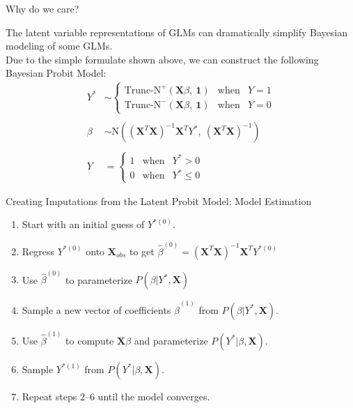 \documentclass{beamer}
\begin{document}
\begin{frame}{Why do we care?}

  The latent variable representations of GLMs can dramatically simplify
  Bayesian modeling of some GLMs.\\
  \vspace{12pt}
  Due to the simple formulate shown above, we can construct the
  following Bayesian Probit Model:
  \begin{align*}
    Y^* &\sim \left\{
          \begin{array}{ccl}
            \text{Trunc-N}^+(\mathbf{X}\beta, ~ \mathbf{1}) & \text{when}
            & Y = 1\\
            \text{Trunc-N}^-(\mathbf{X}\beta, ~ \mathbf{1}) & \text{when}
            & Y = 0
          \end{array}\right.\\
    \\
    \beta &\sim \text{N} \left( (\mathbf{X}^T \mathbf{X})^{-1}
            \mathbf{X}^T Y^*, ~ (\mathbf{X}^T \mathbf{X})^{-1} \right)\\
    \\
    Y &= \left\{ \begin{array}{ccl}
                   1 & \text{when} & Y^* > 0\\
                   0 & \text{when} & Y^* \leq 0
                 \end{array}\right.
  \end{align*}

\end{frame}


\begin{frame}{Creating Imputations from the Latent Probit Model: Model
    Estimation}

  \begin{enumerate}
  \item Start with an initial guess of $Y^{*(0)}$.
    \vspace{6pt}
  \item Regress $Y^{*(0)}$ onto $\mathbf{X}_{obs}$ to get
    $\hat{\beta}^{(0)}=(\mathbf{X}^T \mathbf{X})^{-1} \mathbf{X}^T Y^{*(0)}$
    \vspace{6pt}
  \item Use $\hat{\beta}^{(0)}$ to parameterize $P(\beta | Y^*,
    \mathbf{X})$
    \vspace{6pt}
  \item Sample a new vector of coefficients $\hat{\beta}^{(1)}$ from
    $P(\beta | Y^*, \mathbf{X})$.
    \vspace{6pt}
  \item Use $\hat{\beta}^{(1)}$ to compute $\mathbf{X}\beta$ and
    parameterize $P(Y^* | \beta, \mathbf{X})$.
    \vspace{6pt}
  \item Sample $Y^{*(1)}$ from $P(Y^* | \beta, \mathbf{X})$.
    \vspace{6pt}
  \item Repeat steps 2--6 until the model converges.
  \end{enumerate}

\end{frame}
\end{document}
